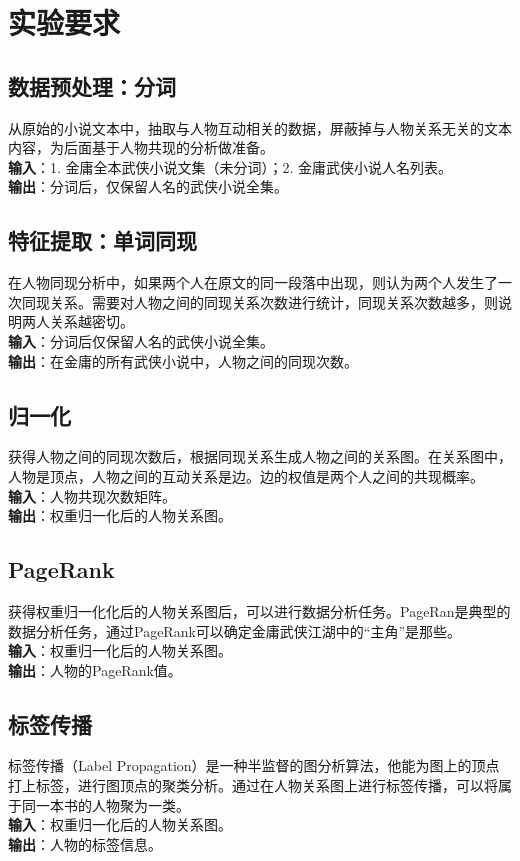 \section{实验要求}
\subsection{数据预处理：分词}
从原始的小说文本中，抽取与人物互动相关的数据，屏蔽掉与人物关系无关的文本内容，为后面基于人物共现的分析做准备。\\
\textbf{输入}：1. 金庸全本武侠小说文集（未分词）；2. 金庸武侠小说人名列表。\\
\textbf{输出}：分词后，仅保留人名的武侠小说全集。
\subsection{特征提取：单词同现}
在人物同现分析中，如果两个人在原文的同一段落中出现，则认为两个人发生了一次同现关系。需要对人物之间的同现关系次数进行统计，同现关系次数越多，则说明两人关系越密切。\\
\textbf{输入}：分词后仅保留人名的武侠小说全集。\\
\textbf{输出}：在金庸的所有武侠小说中，人物之间的同现次数。
\subsection{归一化}
获得人物之间的同现次数后，根据同现关系生成人物之间的关系图。在关系图中，人物是顶点，人物之间的互动关系是边。边的权值是两个人之间的共现概率。\\
\textbf{输入}：人物共现次数矩阵。\\
\textbf{输出}：权重归一化后的人物关系图。
\subsection{PageRank}
获得权重归一化化后的人物关系图后，可以进行数据分析任务。PageRan是典型的数据分析任务，通过PageRank可以确定金庸武侠江湖中的“主角”是那些。\\
\textbf{输入}：权重归一化后的人物关系图。
\\\textbf{输出}：人物的PageRank值。
\subsection{标签传播}
标签传播（Label Propagation）是一种半监督的图分析算法，他能为图上的顶点打上标签，进行图顶点的聚类分析。通过在人物关系图上进行标签传播，可以将属于同一本书的人物聚为一类。\\
\textbf{输入}：权重归一化后的人物关系图。\\
\textbf{输出}：人物的标签信息。
